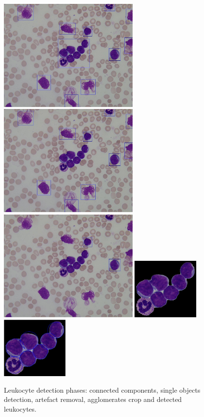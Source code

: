 \documentclass[final,a4paper,12pt,english]{UnicaPhdThesis3}
\begin{document}
\begin{figure}[h]
	\centering
	\includegraphics[width=7cm]{images/2016_1_mva/DetectedIm001_1}
	\includegraphics[width=7cm]{images/2016_1_mva/DetectedIm001_1small}
	\includegraphics[width=7cm]{images/2016_1_mva/DetectedIm001_1solid}
	\includegraphics[width=3.36cm]{images/2016_1_mva/agglomerateclosed}
	\includegraphics[width=3.36cm]{images/2016_1_mva/agglomeratehough}
	\caption{\label{fig:ex9}Leukocyte detection phases: connected components, single objects detection, artefact removal, agglomerates crop and detected leukocytes.}
\end{figure}
\end{document}
